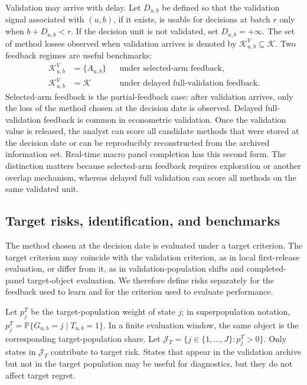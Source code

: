 \documentclass[a4paper, 12pt]{article}
\theoremstyle{plain}
\theoremstyle{remark}
\newcommand{\Prb}{\mathbb{P}}
\newcommand{\Kcal}{\mathcal{K}}
\newcommand{\1}{\mathbf{1}}
\begin{document}
Validation may arrive with delay. Let \(D_{u,b}\) be defined so that the validation signal associated with \((u,b)\), if it exists, is usable for decisions at batch \(r\) only when \(b+D_{u,b}<r\). If the decision unit is not validated, set \(D_{u,b}=+\infty\). The set of method losses observed when validation arrives is denoted by \(\Kcal^V_{u,b}\subseteq\Kcal\). Two feedback regimes are useful benchmarks:
\begin{equation*}
\begin{aligned}
    \Kcal^V_{u,b}&=\{A_{u,b}\}
    &&\text{under selected-arm feedback,}
    \\
    \Kcal^V_{u,b}&=\Kcal
    &&\text{under delayed full-validation feedback.}
\end{aligned}
\end{equation*}
Selected-arm feedback is the partial-feedback case: after validation arrives, only the loss of the method chosen at the decision date is observed. Delayed full-validation feedback is common in econometric validation. Once the validation value is released, the analyst can score all candidate methods that were stored at the decision date or can be reproducibly reconstructed from the archived information set. Real-time macro panel completion has this second form. The distinction matters because selected-arm feedback requires exploration or another overlap mechanism, whereas delayed full validation can score all methods on the same validated unit.

\subsection{Target risks, identification, and benchmarks}

The method chosen at the decision date is evaluated under a target criterion. The target criterion may coincide with the validation criterion, as in local first-release evaluation, or differ from it, as in validation-population shifts and completed-panel target-object evaluation. We therefore define risks separately for the feedback used to learn and for the criterion used to evaluate performance.

Let \(p^T_j\) be the target-population weight of state \(j\); in superpopulation notation, \(p^T_j=\Prb\{G_{u,b}=j\mid T_{u,b}=1\}\). In a finite evaluation window, the same object is the corresponding target-population share. Let \(\mathcal J_T=\{j\in\{1,\ldots,J\}:p^T_j>0\}\). Only states in \(\mathcal J_T\) contribute to target risk. States that appear in the validation archive but not in the target population may be useful for diagnostics, but they do not affect target regret.
\end{document}
